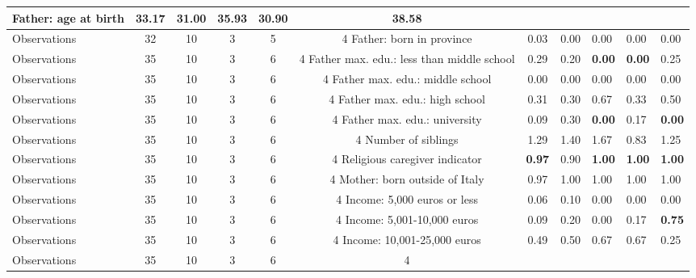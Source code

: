 \begin{tabular}{l c c c c c c }
Father: age at birth & \textbf{    33.17} & \textbf{    31.00} &     35.93 & \textbf{    30.90} &     38.58 \\
\midrule
Observations &        32 &        10 &         3 &         5 &         4
Father: born in province &      0.03 &      0.00 &      0.00 &      0.00 &      0.00 \\
\midrule
Observations &        35 &        10 &         3 &         6 &         4
Father max. edu.: less than middle school &      0.29 &      0.20 & \textbf{     0.00} & \textbf{     0.00} &      0.25 \\
\midrule
Observations &        35 &        10 &         3 &         6 &         4
Father max. edu.: middle school &      0.00 &      0.00 &      0.00 &      0.00 &      0.00 \\
\midrule
Observations &        35 &        10 &         3 &         6 &         4
Father max. edu.: high school &      0.31 &      0.30 &      0.67 &      0.33 &      0.50 \\
\midrule
Observations &        35 &        10 &         3 &         6 &         4
Father max. edu.: university &      0.09 &      0.30 & \textbf{     0.00} &      0.17 & \textbf{     0.00} \\
\midrule
Observations &        35 &        10 &         3 &         6 &         4
Number of siblings &      1.29 &      1.40 &      1.67 &      0.83 &      1.25 \\
\midrule
Observations &        35 &        10 &         3 &         6 &         4
Religious caregiver indicator & \textbf{     0.97} &      0.90 & \textbf{     1.00} & \textbf{     1.00} & \textbf{     1.00} \\
\midrule
Observations &        35 &        10 &         3 &         6 &         4
Mother: born outside of Italy &      0.97 &      1.00 &      1.00 &      1.00 &      1.00 \\
\midrule
Observations &        35 &        10 &         3 &         6 &         4
Income: 5,000 euros or less &      0.06 &      0.10 &      0.00 &      0.00 &      0.00 \\
\midrule
Observations &        35 &        10 &         3 &         6 &         4
Income: 5,001-10,000 euros &      0.09 &      0.20 &      0.00 &      0.17 & \textbf{     0.75} \\
\midrule
Observations &        35 &        10 &         3 &         6 &         4
Income: 10,001-25,000 euros &      0.49 &      0.50 &      0.67 &      0.67 &      0.25 \\
\midrule
Observations &        35 &        10 &         3 &         6 &         4

\end{tabular}
